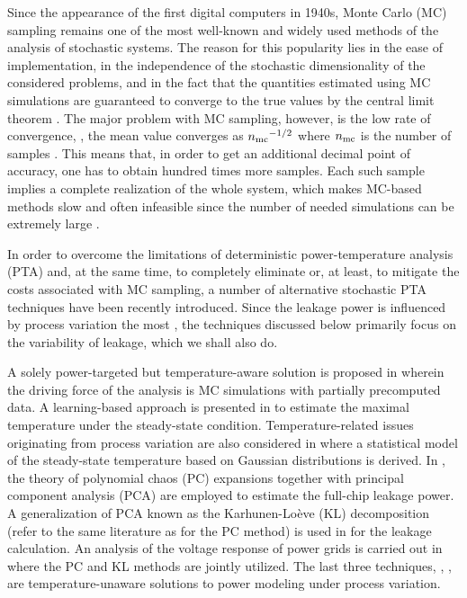 Since the appearance of the first digital computers in 1940s, Monte Carlo (MC) sampling remains one of the most well-known and widely used methods of the analysis of stochastic systems.
The reason for this popularity lies in the ease of implementation, in the independence of the stochastic dimensionality of the considered problems, and in the fact that the quantities estimated using MC simulations are guaranteed to converge to the true values by the central limit theorem \cite{durrett2010}.
The major problem with MC sampling, however, is the low rate of convergence, \eg, the mean value converges as ${n_\text{mc}}^{-{{1}/{2}}}$ where ${n_\text{mc}}$ is the number of samples \cite{xiu2010, maitre2010}.
This means that, in order to get an additional decimal point of accuracy, one has to obtain hundred times more samples.
Each such sample implies a complete realization of the whole system, which makes MC-based methods slow and often infeasible since the number of needed simulations can be extremely large \cite{diaz-emparanza2002}.

In order to overcome the limitations of deterministic power-temperature analysis (PTA) and, at the same time, to completely eliminate or, at least, to mitigate the costs associated with MC sampling, a number of alternative stochastic PTA techniques have been recently introduced.
Since the leakage power is influenced by process variation the most \cite{chandrakasan2001, srivastava2010, juan2011, juan2012}, the techniques discussed below primarily focus on the variability of leakage, which we shall also do.

A solely power-targeted but temperature-aware solution is proposed in \cite{chandra2010} wherein the driving force of the analysis is MC simulations with partially precomputed data.
A learning-based approach is presented in \cite{juan2011} to estimate the maximal temperature under the steady-state condition.
Temperature-related issues originating from process variation are also considered in \cite{juan2012} where a statistical model of the steady-state temperature based on Gaussian distributions is derived.
In \cite{shen2009}, the theory of polynomial chaos (PC) expansions \cite{xiu2010, maitre2010, ghanem1991, eldred2008} together with principal component analysis (PCA) are employed to estimate the full-chip leakage power.
A generalization of PCA known as the Karhunen-Lo\`{e}ve (KL) decomposition (refer to the same literature as for the PC method) is used in \cite{bhardwaj2006} for the leakage calculation.
An analysis of the voltage response of power grids is carried out in \cite{ghanta2006} where the PC and KL methods are jointly utilized. The last three techniques, \ie, \cite{shen2009, bhardwaj2006, ghanta2006}, are temperature-unaware solutions to power modeling under process variation.

